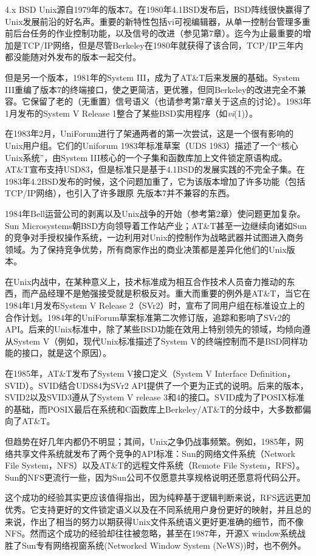 \documentclass[12pt,oneside]{ctexbook}
\begin{document}
\begin{common-format}
4.x BSD Unix源自1979年的版本7。在1980年4.1BSD发布后，BSD阵线很快赢得了Unix发展前沿的好名声。重要的新特性包括vi可视编辑器，从单一控制台管理多重前后台任务的作业控制功能，以及信号的改进（参见第7章）。迄今为止最重要的增加是TCP/IP网络，但是尽管Berkeley在1980年就获得了该合同，TCP/IP三年内都没能随对外发布的版本一起交付。

但是另一个版本，1981年的System III，成为了AT\&{}T后来发展的基础。System III重编了版本7的终端接口，使之更简洁，更优雅，但同Berkeley的改进完全不兼容。它保留了老的（无重置）信号语义（也请参考第7章关于这点的讨论）。1983年1月发布的System V Release 1整合了某些BSD实用程序（如\textit{vi}(1)）。

在1983年2月，UniForum进行了架通两者的第一次尝试，这是一个很有影响的Unix用户组。它们的Uniforum 1983年标准草案（UDS 1983）描述了一个“核心Unix系统”，由System III核心的一个子集和函数库加上文件锁定原语构成。AT\&{}T宣布支持USD83，但是标准只是基于4.1BSD的发展实践的不完全子集。在1983年4.2BSD发布的时候，这个问题加重了，它为该版本增加了许多功能（包括TCP/IP网络），也引入了许多跟原
先版本7并不兼容的东西。

1984年Bell运营公司的剥离以及Unix战争的开始（参考第2章）使问题更加复杂。Sun Microsystems朝BSD方向领导着工作站产业；AT\&{}T甚至一边继续向诸如Sun的竞争对手授权操作系统，一边利用对Unix的控制作为战略武器并试图进入商务领域。为了保持竞争优势，所有商家作出的商业决策都是差异化他们的Unix版本。

在Unix内战中，在某种意义上，技术标准成为相互合作技术人员奋力推动的东西，而产品经理不是勉强接受就是积极反对。重大而重要的例外是AT\&{}T，当它在1984年1月发布System V Release 2（SVr2）时，宣布了同用户组在标准设立上的合作计划。1984年的UniForum草案标准第二次修订版，追踪和影响了SVr2的API。后来的Unix标准中，除了某些BSD功能在效用上特别领先的领域，均倾向遵从System V（例如，现代Unix标准描述了System V的终端控制而不是BSD同样功能的接口，就是这个原因）。

在1985年，AT\&{}T发布了System V接口定义（System V Interface Definition，SVID）。SVID结合UDS84为SVr2 API提供了一个更为正式的说明。后来的版本，SVID2以及SVID3遵从了System V release 3和4的接口。SVID成为了POSIX标准的基础，而POSIX最后在系统和C函数库上Berkeley/AT\&{}T的分歧中，大多数都偏向了AT\&{}T。

但趋势在好几年内都仍不明显；其间，Unix之争仍战事频繁。例如，1985年，网络共享文件系统就发布了两个竞争的API标准：Sun的网络文件系统（Network File System，NFS）以及AT\&{}T的远程文件系统（Remote File System，RFS）。Sun的NFS更流行一些，因为Sun公司不仅愿意共享规格说明还愿意将代码公开。

这个成功的经验其实更应该值得指出，因为纯粹基于逻辑判断来说，RFS远远更加优秀。它支持更好的文件锁定语义以及在不同系统用户身份更好的映射，并且总的来说，作出了相当的努力以期获得Unix文件系统语义更好更准确的细节，而不像NFS。然而这个成功的经验却往往被忽略，甚至在1987年，开源X window系统战胜了Sun专有网络视窗系统(Networked Window System (NeWS))时，也不例外。


\end{common-format}
\end{document}
